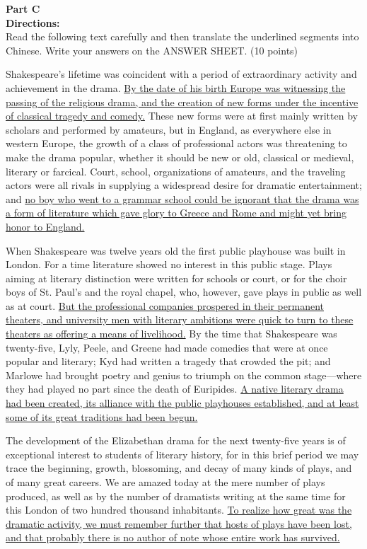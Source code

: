 \phantom{ \linefill \linefill \linefill \linefill \linefill}


\newpage

\noindent
\textbf{Part C}\\
\textbf{Directions:}\\
Read the following text carefully and then translate the underlined
segments into Chinese. Write your answers on the ANSWER SHEET. (10
points)


\TiGanSpace

Shakespeare's lifetime was coincident with a period of extraordinary
activity and achievement in the drama. \transnum \uline{By the date of
	his birth Europe was witnessing the passing of the religious drama, and
	the creation of new forms under the incentive of classical tragedy and
	comedy.} These new forms were at first mainly written by scholars and
performed by amateurs, but in England, as everywhere else in western
Europe, the growth of a class of professional actors was threatening to
make the drama popular, whether it should be new or old, classical or
medieval, literary or farcical. Court, school, organizations of
amateurs, and the traveling actors were all rivals in supplying a
widespread desire for dramatic entertainment; and \transnum \uline{no boy
	who went to a grammar school could be ignorant that the drama was a form
	of literature which gave glory to Greece and Rome and might yet bring
	honor to England.}

When Shakespeare was twelve years old the first public playhouse was
built in London. For a time literature showed no interest in this public
stage. Plays aiming at literary distinction were written for schools or
court, or for the choir boys of St. Paul's and the royal chapel, who,
however, gave plays in public as well as at court. \transnum \uline{But
	the professional companies prospered in their permanent theaters, and
	university men with literary ambitions were quick to turn to these
	theaters as offering a means of livelihood.} By the time that
Shakespeare was twenty-five, Lyly, Peele, and Greene had made comedies
that were at once popular and literary; Kyd had written a tragedy that
crowded the pit; and Marlowe had brought poetry and genius to triumph on
the common stage---where they had played no part since the death of
Euripides. \transnum \uline{A native literary drama had been created, its
	alliance with the public playhouses established, and at least some of
	its great traditions had been begun.}

The development of the Elizabethan drama for the next twenty-five years
is of exceptional interest to students of literary history, for in this
brief period we may trace the beginning, growth, blossoming, and decay
of many kinds of plays, and of many great careers. We are amazed today
at the mere number of plays produced, as well as by the number of
dramatists writing at the same time for this London of two hundred
thousand inhabitants. \transnum \uline{To realize how great was the
	dramatic activity, we must remember further that hosts of plays have
	been lost, and that probably there is no author of note whose entire
	work has survived.}


